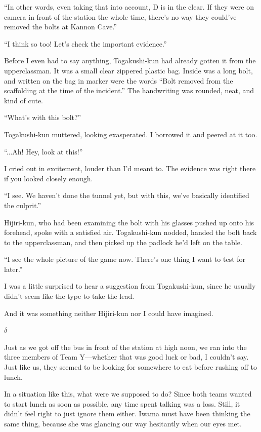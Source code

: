 \documentclass[
    a4paper,
    12pt,
    twoside,
    openany,
    UTF8,
    fontset=windows
]{ctexbook}
\begin{document}
``In other words, even taking that into account, D is in the clear. If they were on camera in front of the station the whole time, there's no way they could've removed the bolts at Kannon Cave.''

``I think so too! Let's check the important evidence.''

Before I even had to say anything, Togakushi-kun had already gotten it from the upperclassman. It was a small clear zippered plastic bag. Inside was a long bolt, and written on the bag in marker were the words ``Bolt removed from the scaffolding at the time of the incident.'' The handwriting was rounded, neat, and kind of cute.

``What's with this bolt?''

Togakushi-kun muttered, looking exasperated. I borrowed it and peered at it too.

``...Ah! Hey, look at this!''

I cried out in excitement, louder than I'd meant to. The evidence was right there if you looked closely enough.

``I see. We haven't done the tunnel yet, but with this, we've basically identified the culprit.''

Hijiri-kun, who had been examining the bolt with his glasses pushed up onto his forehead, spoke with a satisfied air. Togakushi-kun nodded, handed the bolt back to the upperclassman, and then picked up the padlock he'd left on the table.

``I see the whole picture of the game now. There's one thing I want to test for later.''

I was a little surprised to hear a suggestion from Togakushi-kun, since he usually didn't seem like the type to take the lead.

And it was something neither Hijiri-kun nor I could have imagined.

$\delta$

Just as we got off the bus in front of the station at high noon, we ran into the three members of Team Y---whether that was good luck or bad, I couldn't say. Just like us, they seemed to be looking for somewhere to eat before rushing off to lunch.

In a situation like this, what were we supposed to do? Since both teams wanted to start lunch as soon as possible, any time spent talking was a loss. Still, it didn't feel right to just ignore them either. Iwama must have been thinking the same thing, because she was glancing our way hesitantly when our eyes met.
\end{document}

